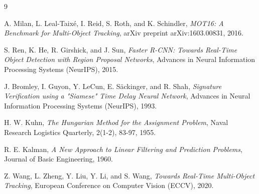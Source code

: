 \documentclass[11pt, letterpaper]{article}
\begin{document}
\begin{thebibliography}{9}

A. Milan, L. Leal-Taix{\'e}, I. Reid, S. Roth, and K. Schindler, 
\textit{MOT16: A Benchmark for Multi-Object Tracking}, 
arXiv preprint arXiv:1603.00831, 2016.

S. Ren, K. He, R. Girshick, and J. Sun, 
\textit{Faster R-CNN: Towards Real-Time Object Detection with Region Proposal Networks}, 
Advances in Neural Information Processing Systems (NeurIPS), 2015.

J. Bromley, I. Guyon, Y. LeCun, E. Säckinger, and R. Shah, 
\textit{Signature Verification using a "Siamese" Time Delay Neural Network}, 
Advances in Neural Information Processing Systems (NeurIPS), 1993.

H. W. Kuhn, 
\textit{The Hungarian Method for the Assignment Problem}, 
Naval Research Logistics Quarterly, 2(1-2), 83-97, 1955.

R. E. Kalman, 
\textit{A New Approach to Linear Filtering and Prediction Problems}, 
Journal of Basic Engineering, 1960.

Z. Wang, L. Zheng, Y. Liu, Y. Li, and S. Wang, 
\textit{Towards Real-Time Multi-Object Tracking}, 
European Conference on Computer Vision (ECCV), 2020.

\end{thebibliography}
\end{document}
